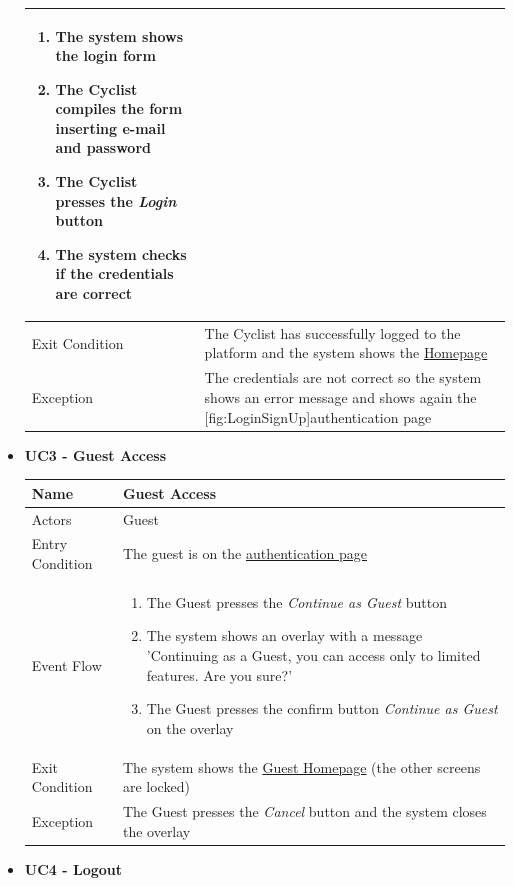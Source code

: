 \begin{itemize}
\begin{tabular}{|p{7cm}|p{7cm}|}
\begin{enumerate}
    \item The system shows the login form
    \item The Cyclist compiles the form inserting e-mail and password
    \item The Cyclist presses the \textit{Login} button
    \item The system checks if the credentials are correct
\end{enumerate}
\\ \hline
Exit Condition  & The Cyclist has successfully logged to the platform and the system shows the \hyperref[fig:Homepage]{Homepage}\\ \hline
Exception       & The credentials are not correct so the system shows an error message and shows again the [fig:LoginSignUp]{authentication page}
\\ \hline
\end{tabular}
\newpage
\item \textbf{UC3 - Guest Access}\par\smallskip
\noindent
\begin{tabular}{|p{7cm}|p{7cm}|}
\hline
Name            & Guest Access \\ \hline
Actors          & Guest \\ \hline
Entry Condition & The guest is on the \hyperref[fig:LoginSignUp]{authentication page}\\ \hline
Event Flow      &  
\begin{enumerate}
    \item The Guest presses the \textit{Continue as Guest} button
    \item The system shows an overlay with a message 'Continuing as a Guest, you can access only to limited features. Are you sure?'
    \item The Guest presses the confirm button \textit{Continue as Guest} on the overlay
\end{enumerate}
\\ \hline
Exit Condition  & The system shows the  \hyperref[fig:Homepage]{ Guest Homepage} (the other screens are locked)\\ \hline
Exception   & The Guest presses the \textit{Cancel} button and the system closes the overlay \\ \hline
\end{tabular}
\bigskip
\item \textbf{UC4 - Logout}\par\smallskip
\noindent
\begin{tabular}{|p{7cm}|p{7cm}|}

\end{tabular}
\end{itemize}
